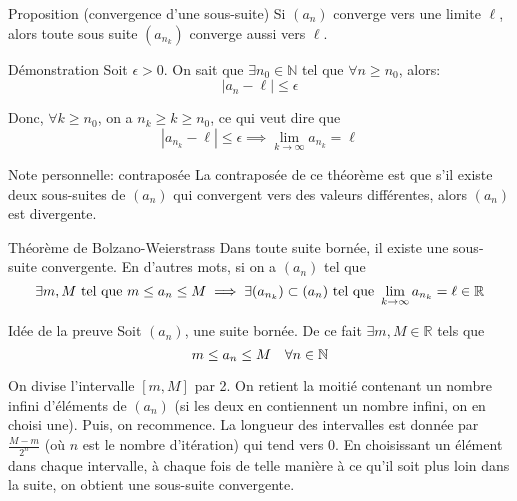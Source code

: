 \documentclass[a4paper]{article}
\begin{document}
\begin{parag}{Proposition (convergence d'une sous-suite)}
    Si $\left(a_n\right)$ converge vers une limite $\ell$, alors toute sous suite $\left(a_{n_{k}}\right)$ converge aussi vers $\ell$.

    \begin{subparag}{Démonstration}
        Soit $\epsilon > 0$. On sait que $\exists n_0 \in \mathbb{N}$ tel que $\forall n \geq n_0$, alors:
        \[\left|a_{n} - \ell\right| \leq \epsilon\]


        Donc, $\forall k \geq n_0$, on a $n_k \geq k \geq n_0$, ce qui veut dire que
        \[\left|a_{n_k} - \ell\right| \leq \epsilon \implies \lim_{k \to \infty} a_{n_k} = \ell\]
    \end{subparag}

    \begin{subparag}{Note personnelle: contraposée}
        La contraposée de ce théorème est que s'il existe deux sous-suites de $\left(a_n\right)$ qui convergent vers des valeurs différentes, alors $\left(a_n\right)$ est divergente.
    \end{subparag}

\end{parag}

\begin{parag}{Théorème de Bolzano-Weierstrass}
    Dans toute suite bornée, il existe une sous-suite convergente. En d'autres mots, si on a $\left(a_n\right)$ tel que
    \[\exists m, M \telque m \leq a_n \leq M \implies \exists \left(a_{n_k}\right) \subset \left(a_n\right) \telque \lim_{k \to \infty} a_{n_k} = \ell \in \mathbb{R}\]


    \begin{subparag}{Idée de la preuve}
        Soit $\left(a_n\right)$, une suite bornée. De ce fait $\exists m, M \in \mathbb{R}$ tels que
        \[m \leq a_n \leq M \quad \forall n \in \mathbb{N}\]

        On divise l'intervalle $\left[m,M\right]$ par 2. On retient la moitié contenant un nombre infini d'éléments de $\left(a_n\right)$ (si les deux en contiennent un nombre infini, on en choisi une). Puis, on recommence. La longueur des intervalles est donnée par $\frac{M - m}{2^{n}}$ (où $n$ est le nombre d'itération) qui tend vers 0. En choisissant un élément dans chaque intervalle, à chaque fois de telle manière à ce qu'il soit plus loin dans la suite, on obtient une sous-suite convergente.
    \end{subparag}

\end{parag}
\end{document}
